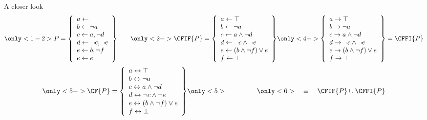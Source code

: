 \begin{frame}{A closer look}
\[
\only<1-2>{%
P
=
 \left\{
    \begin{array}{l}
      a \leftarrow                  \\
      b \leftarrow \neg a          \\
      c \leftarrow a, \neg d       \\
      d \leftarrow \neg c, \neg e \\
      e \leftarrow b, \neg f       \\
      e \leftarrow e
    \end{array}
  \right\}
\qquad}
\only<2->{%
\CFIF{P}
=
 \left\{
    \begin{array}{l}
      a \leftarrow \top                  \\
      b \leftarrow \neg{a}               \\
      c \leftarrow a\wedge \neg{d}       \\
      d \leftarrow \neg{c}\wedge \neg{e} \\
      e \leftarrow (b\wedge \neg{f}) \vee e\\
      f \leftarrow \bot
    \end{array}
  \right\}
}
\only<4->{%
 \left\{
    \begin{array}{l}
      a \rightarrow \top                  \\
      b \rightarrow \neg{a}               \\
      c \rightarrow a\wedge \neg{d}       \\
      d \rightarrow \neg{c}\wedge \neg{e} \\
      e \rightarrow (b\wedge \neg{f}) \vee e\\
      f \rightarrow \bot
    \end{array}
  \right\}
  =
  \CFFI{P}}
\]
\[
\only<5->{%
  \CF{P}
  =
  \left\{
    \begin{array}{l}
      a \leftrightarrow \top                  \\
      b \leftrightarrow \neg{a}               \\
      c \leftrightarrow a\wedge \neg{d}       \\
      d \leftrightarrow \neg{c}\wedge \neg{e} \\
      e \leftrightarrow (b\wedge \neg{f}) \vee e\\
      f \leftrightarrow \bot
    \end{array}
  \right\}}
\only<5>{\phantom{ = \CF{P} }}
\only<6>{\quad\equiv\quad\CFIF{P}\cup\CFFI{P}}
\]
\end{frame}

